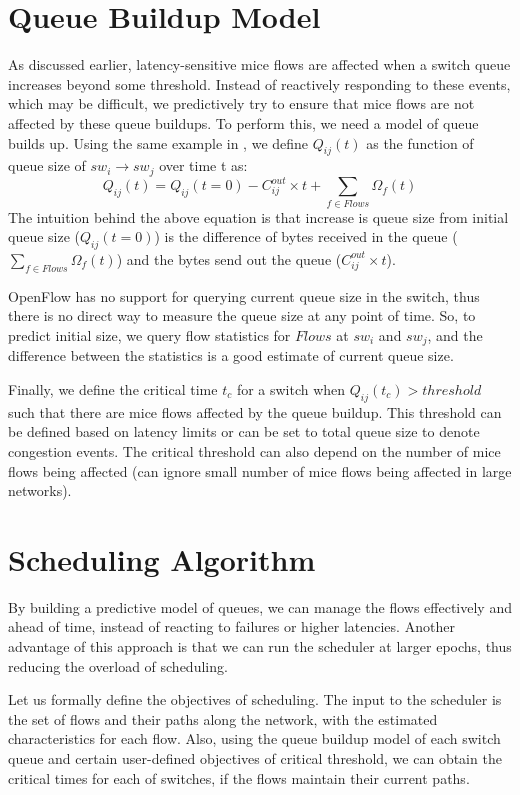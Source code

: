 \section{Queue Buildup Model}
As discussed earlier, latency-sensitive mice flows are affected when a switch queue increases beyond
some threshold. Instead of reactively responding to these events, which may be difficult, we 
predictively try to ensure that mice flows are not affected by these queue buildups. To perform this,
we need a model of queue builds up. Using the same example in , we define $Q_{ij}(t)$ as the function of queue size of $sw_i \rightarrow sw_j$ over time t as:
\begin{equation}
	Q_{ij}(t) = Q_{ij}(t=0) - C_{ij}^{out} \times t + \sum_{f \in Flows} \Omega_f(t)
\end{equation}
The intuition behind the above equation is that increase is queue size from initial
queue size ($Q_{ij}(t=0)$) is the difference of bytes received in the queue ($\sum_{f \in Flows} \Omega_f(t)$) and the bytes send out the queue ($C_{ij}^{out} \times t $). 

OpenFlow has no support for querying current queue size in the switch, thus
there is no direct way to measure the queue size at any point of time. So, to 
predict initial size, we query flow statistics for $Flows$ at $sw_i$ and $sw_j$,
and the difference between the statistics is a good estimate of current queue size.

Finally, we define the critical time $t_c$ for a switch when $Q_{ij}(t_c) > threshold$ such 
that there are mice flows affected by the queue buildup.  This 
threshold can be defined based on latency limits or can be set to total queue size to
denote congestion events. The critical threshold can also depend on the number of 
mice flows being affected (can ignore small number of mice flows being affected in large
networks).

\section{Scheduling Algorithm}
By building a predictive model of queues, we can manage the flows effectively
and ahead of time, instead of reacting to failures or higher latencies. Another advantage 
of this approach is that we can run the scheduler at larger epochs, thus reducing the
overload of scheduling. 

Let us formally define the objectives of scheduling. The input to the scheduler
is the set of flows and their paths along the network, with the estimated  
characteristics for each flow. Also, using the queue buildup model of each switch
queue and certain user-defined objectives of critical threshold, we can obtain the
critical times for each of switches, if the flows maintain their current paths. 

